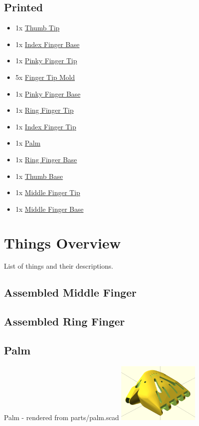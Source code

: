 \documentclass[11pt]{article}
\begin{document}
\subsection{Printed}
\begin{itemize}
\item 1x \hyperlink{thing_thumb\_tip}{Thumb Tip}
\item 1x \hyperlink{thing_index\_base}{Index Finger Base}
\item 1x \hyperlink{thing_pinky\_tip}{Pinky Finger Tip}
\item 5x \hyperlink{thing_finger\_tip\_mold}{Finger Tip Mold}
\item 1x \hyperlink{thing_pinky\_base}{Pinky Finger Base}
\item 1x \hyperlink{thing_ring\_tip}{Ring Finger Tip}
\item 1x \hyperlink{thing_index\_tip}{Index Finger Tip}
\item 1x \hyperlink{thing_palm}{Palm}
\item 1x \hyperlink{thing_ring\_base}{Ring Finger Base}
\item 1x \hyperlink{thing_thumb\_base}{Thumb Base}
\item 1x \hyperlink{thing_middle\_tip}{Middle Finger Tip}
\item 1x \hyperlink{thing_middle\_base}{Middle Finger Base}
\end{itemize}

\newpage

\section{Things Overview}
List of things and their descriptions.

\hypertarget{thing_middle\_finger\_assembly}{\subsection{Assembled Middle Finger}}

\hypertarget{thing_ring\_finger\_assembly}{\subsection{Assembled Ring Finger}}

\hypertarget{thing_palm}{\subsection{Palm}}
Palm - rendered from parts/palm.scad
\includegraphics[width=4cm]{images/palm.png}
\end{document}
